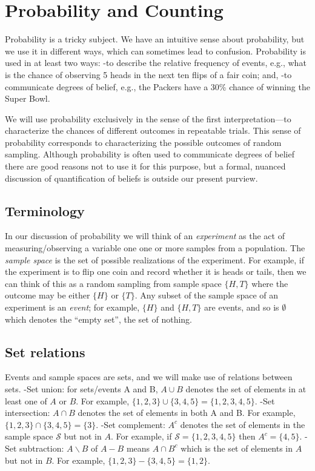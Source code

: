\documentclass[
]{book}
\theoremstyle{definition}
\theoremstyle{definition}
\theoremstyle{definition}
\theoremstyle{definition}
\theoremstyle{remark}
\begin{document}
\hypertarget{probability-and-counting}{%
\chapter{Probability and Counting}\label{probability-and-counting}}

Probability is a tricky subject. We have an intuitive sense about probability, but we use it in different ways, which can sometimes lead to confusion. Probability is used in at least two ways:
-to describe the relative frequency of events, e.g., what is the chance of observing 5 heads in the next ten flips of a fair coin; and,
-to communicate degrees of belief, e.g., the Packers have a 30\% chance of winning the Super Bowl.

We will use probability exclusively in the sense of the first interpretation---to characterize the chances of different outcomes in repeatable trials. This sense of probability corresponds to characterizing the possible outcomes of random sampling. Although probability is often used to communicate degrees of belief there are good reasons not to use it for this purpose, but a formal, nuanced discussion of quantification of beliefs is outside our present purview.

\hypertarget{terminology}{%
\section{Terminology}\label{terminology}}

In our discussion of probability we will think of an \emph{experiment} as the act of measuring/observing a variable one one or more samples from a population. The \emph{sample space} is the set of possible realizations of the experiment. For example, if the experiment is to flip one coin and record whether it is heads or tails, then we can think of this as a random sampling from sample space \(\{H, T\}\) where the outcome may be either \(\{H\}\) or \(\{T\}\). Any subset of the sample space of an experiment is an \emph{event}; for example, \(\{H\}\) and \(\{H,T\}\) are events, and so is \(\emptyset\) which denotes the ``empty set'', the set of nothing.

\hypertarget{set-relations}{%
\section{Set relations}\label{set-relations}}

Events and sample spaces are sets, and we will make use of relations between sets.
-Set union: for sets/events A and B, \(A\cup B\) denotes the set of elements in at least one of \(A\) or \(B\). For example, \(\{1,2,3\}\cup\{3,4,5\} = \{1,2,3,4,5\}\).
-Set intersection: \(A\cap B\) denotes the set of elements in both A and B. For example, \(\{1,2,3\}\cap\{3,4,5\} = \{3\}\).
-Set complement: \(A^c\) denotes the set of elements in the sample space \(\mathcal{S}\) but not in \(A\). For example, if \(\mathcal{S} = \{1,2,3,4,5\}\) then \(A^c = \{4,5\}\).
-Set subtraction: \(A\backslash B\) of \(A-B\) means \(A\cap B^c\) which is the set of elements in \(A\) but not in \(B\). For example, \(\{1,2,3\}-\{3,4,5\} = \{1,2\}\).\\
\end{document}
